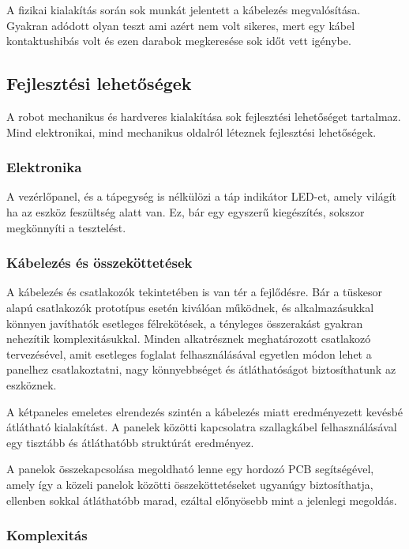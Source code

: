 \medskip

A fizikai kialakítás során sok munkát jelentett a kábelezés megvalósítása.
Gyakran adódott olyan teszt ami azért nem volt sikeres, mert egy kábel
kontaktushibás volt és ezen darabok megkeresése sok időt vett igénybe.

\subsection{Fejlesztési lehetőségek}

A robot mechanikus és hardveres kialakítása sok fejlesztési lehetőséget
tartalmaz. Mind elektronikai, mind mechanikus oldalról léteznek fejlesztési
lehetőségek.

\subsubsection{Elektronika}

A vezérlőpanel, és a tápegység is nélkülözi a táp indikátor LED-et, amely világít
ha az eszköz feszültség alatt van. Ez, bár egy egyszerű kiegészítés, sokszor
megkönnyíti a tesztelést.

\subsubsection{Kábelezés és összeköttetések}

A kábelezés és csatlakozók tekintetében is van tér a fejlődésre. Bár a tüskesor
alapú csatlakozók prototípus esetén kiválóan működnek, és alkalmazásukkal könnyen
javíthatók esetleges félrekötések, a tényleges összerakást gyakran nehezítik
komplexitásukkal. Minden alkatrésznek meghatározott csatlakozó tervezésével, amit
esetleges foglalat felhasználásával egyetlen módon lehet a panelhez
csatlakoztatni, nagy könnyebbséget és átláthatóságot biztosíthatunk az eszköznek.

\medskip

A kétpaneles emeletes elrendezés szintén a kábelezés miatt eredményezett kevésbé
átlátható kialakítást. A panelek közötti kapcsolatra szallagkábel
felhasználásával egy tisztább és átláthatóbb struktúrát eredményez.

\medskip

A panelok összekapcsolása megoldható lenne egy hordozó PCB
segítségével, amely így a közeli panelok közötti összeköttetéseket ugyanúgy
biztosíthatja, ellenben sokkal átláthatóbb marad, ezáltal előnyösebb mint a
jelenlegi megoldás.

\subsubsection{Komplexitás}

